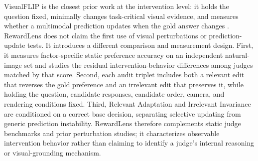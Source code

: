 VisualFLIP is the closest prior work at the intervention level: it holds the question fixed, minimally changes task-critical visual evidence, and measures whether a multimodal prediction updates when the gold answer changes \citep{zhu2026visualflip}. RewardLens does not claim the first use of visual perturbations or prediction-update tests. It introduces a different comparison and measurement design. First, it measures factor-specific static preference accuracy on an independent natural-image set and studies the residual intervention-behavior differences among judges matched by that score. Second, each audit triplet includes both a relevant edit that reverses the gold preference and an irrelevant edit that preserves it, while holding the question, candidate responses, candidate order, camera, and rendering conditions fixed. Third, Relevant Adaptation and Irrelevant Invariance are conditioned on a correct base decision, separating selective updating from generic prediction instability. RewardLens therefore complements static judge benchmarks and prior perturbation studies; it characterizes observable intervention behavior rather than claiming to identify a judge's internal reasoning or visual-grounding mechanism.
